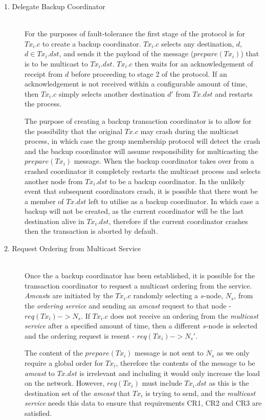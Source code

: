     \begin{description}
    
        \item[1. Delegate Backup Coordinator] \hfill \\
        For the purposes of fault-tolerance the first stage of the protocol is for $Tx_i.c$ to create a backup coordinator.  $Tx_i.c$ selects any destination, $d$, $d \in Tx_i.dst$, and sends it the payload of the message ($prepare(Tx_i)$) that is to be multicast to $Tx_i.dst$.  $Tx_i.c$ then waits for an acknowledgement of receipt from $d$ before proceeding to stage 2 of the protocol.  If an acknowledgement is not received within a configurable amount of time, then $Tx_i.c$ simply selects another destination $d'$ from $Tx.dst$ and restarts the process.  
        
        The purpose of creating a backup transaction coordinator is to allow for the possibility that the original $Tx.c$ may crash during the multicast process, in which case the group membership protocol will detect the crash and the backup coordinator will assume responsibility for multicasting the $prepare(Tx_i)$ message.  When the backup coordinator takes over from a crashed coordinator it completely restarts the multicast process and selects another node from $Tx_i.dst$ to be a backup coordinator.  In the unlikely event that subsequent coordinators crash, it is possible that there wont be a member of $Tx.dst$ left to utilise as a backup coordinator.  In which case a backup will not be created, as the current coordinator will be the last destination alive in $Tx_i.dst$, therefore if the current coordinator crashes then the transaction is aborted by default.  
                
        \item[2. Request Ordering from Multicast Service] \hfill \\
        Once the a backup coordinator has been established, it is possible for the transaction coordinator to request a multicast ordering from the service.  \emph{Amcast}s are initiated by the $Tx_i.c$ randomly selecting a $s$-node, $N_s$, from the \emph{ordering service} and sending an \emph{amcast} request to that node - $req(Tx_i) -> N_s$.  If $Tx_i.c$ does not receive an ordering from the \emph{multicast service} after a specified amount of time, then a different $s$-node is selected and the ordering request is resent - $req(Tx_i) -> N_s'$.  
        
        The content of the $prepare(Tx_i)$ message is not sent to $N_s$ as we only require a global order for $Tx_i$, therefore the contents of the message to be \emph{amcast} to $Tx.dst$ is irrelevant and including it would only increase the load on the network.  However, $req(Tx_i)$ must include $Tx_i.dst$ as this is the destination set of the \emph{amcast} that $Tx_i$ is trying to send, and the \emph{multicast service} needs this data to ensure that requirements CR1, CR2 and CR3 are satisfied.  
        

\end{description}
